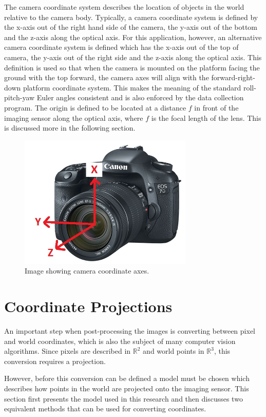 The camera coordinate system describes the location of objects in the world relative to the camera body.  Typically, a camera coordinate system is defined by the x-axis out of the right hand side of the camera, the y-axis out of the bottom and the z-axis along the optical axis.  For this application, however, an alternative camera coordinate system is defined which has the x-axis out of the top of camera, the y-axis out of the right side and the z-axis along the optical axis.  This definition is used so that when the camera is mounted on the platform facing the ground with the top forward, the camera axes will align with the forward-right-down platform coordinate system.  This makes the meaning of the standard roll-pitch-yaw Euler angles consistent and is also enforced by the data collection program.  The origin is defined to be located at a distance $f$ in front of the imaging sensor along the optical axis, where $f$ is the focal length of the lens.  This is discussed more in the following section.

\begin{figure}
	\centering
    \includegraphics[height=2.5in]{figures/camera_frame_canon.jpg}
    \caption[Camera coordinate frame]{Image showing camera coordinate axes.}
    \label{figure:camera_axes}
\end{figure}

\section{Coordinate Projections}
 
 An important step when post-processing the images is converting between pixel and world coordinates, which is also the subject of many computer vision algorithms.  Since pixels are described in $\mathbb{R}^2$ and world points in $\mathbb{R}^3$, this conversion requires a projection.  
 
 However, before this conversion can be defined a model must be chosen which describes how points in the world are projected onto the imaging sensor.  This section first presents the model used in this research and then discusses two equivalent methods that can be used for converting coordinates.  
 
